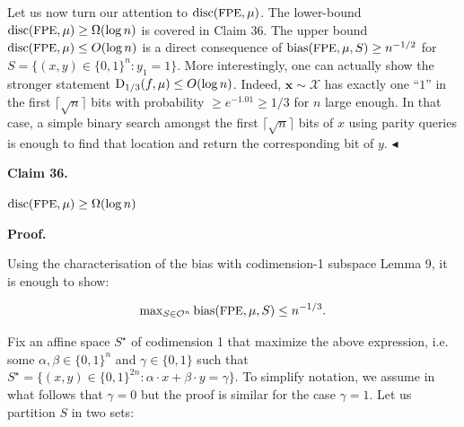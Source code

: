 \documentclass[10pt,a4paper]{article}
\begin{document}
Let us now turn our attention to ${\textup{disc}}({\textrm{\small{FPE}}},\mu)$.
The lower-bound ${\textup{disc}}({\textrm{\small{FPE}}},\mu)\geq\Omega(\log n)$ is covered in Claim 36. The upper bound ${\textup{disc}}({\textrm{\small{FPE}}},\mu)\leq O(\log n)$ is a direct consequence of ${\textup{bias}}({\textrm{\small{FPE}}},\mu,S)\geq n^{-1/2}$ for $S=\{(x,y)\in\{0,1\}^{n}:y_{1}=1\}$. More interestingly, one can actually show the stronger statement ${\textup{D}}_{1/3}(f,\mu)\leq O(\log n)$. Indeed, $\bm{x}\sim\mathcal{X}$ has exactly one “$1$” in the first $\lceil\sqrt{n}\rceil$ bits with probability $\geq e^{-1.01}\geq 1/3$ for $n$ large enough. In that case, a simple binary search amongst the first $\lceil\sqrt{n}\rceil$ bits of $x$ using parity queries is enough to find that location and return the corresponding bit of $y$.
$\blacktriangleleft$\par





\par\medskip\noindent\textbf{
Claim 36. 
}\par



${\textup{disc}}(\textup{{{\small{FPE}}}},\mu)\geq\Omega(\log n)$\par







\par\medskip\noindent\textbf{
\textbf{Proof}.}\par




Using the characterisation of the bias with codimension-1 subspace Lemma 9, it is enough to show:\par


\[\begin{gathered}
\max\nolimits_{S\in\mathcal{O}^{n}}{\textup{bias}}({\textrm{\small{FPE}}},\mu,S)\leq n^{-1/3}.
\end{gathered}\]


Fix an affine space $S^{\star}$ of codimension 1 that maximize the above expression, i.e. some $\alpha,\beta\in\{0,1\}^{n}$ and $\gamma\in\{0,1\}$ such that $S^{\star}=\{(x,y)\in\{0,1\}^{2n}:\alpha\cdot x+\beta\cdot y=\gamma\}$. To simplify notation, we assume in what follows that $\gamma=0$ but the proof is similar for the case $\gamma=1$. Let us partition $S$ in two sets:\par
\end{document}
